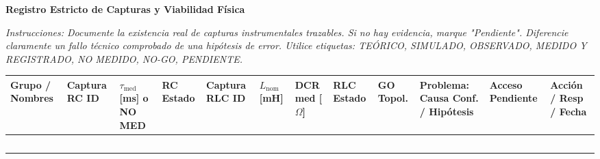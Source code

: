 \documentclass[11pt, a4paper, landscape]{article}
\begin{document}
\begin{tcolorbox}[colback=ucbblue!5!white, colframe=ucbblue, title=\textbf{Artefacto A1: Matriz de Evidencia y Diagnóstico Operativo (EC3)}]
    \centering \textbf{Registro Estricto de Capturas y Viabilidad Física}
\end{tcolorbox}

\noindent\textit{Instrucciones: Documente la existencia real de capturas instrumentales trazables. Si no hay evidencia, marque "Pendiente". Diferencie claramente un fallo técnico comprobado de una hipótesis de error. Utilice etiquetas: TEÓRICO, SIMULADO, OBSERVADO, MEDIDO Y REGISTRADO, NO MEDIDO, NO-GO, PENDIENTE.}

\vspace{0.3cm}
{\small
\setlength{\tabcolsep}{3pt}
\renewcommand{\arraystretch}{1.5}
\noindent
\begin{tabularx}{\textwidth}{
  >{\bfseries\RaggedRight\hsize=0.6\hsize}X 
  >{\RaggedRight\arraybackslash\hsize=0.8\hsize}X 
  >{\centering\arraybackslash\hsize=0.6\hsize}X 
  >{\centering\arraybackslash\hsize=0.7\hsize}X 
  >{\RaggedRight\arraybackslash\hsize=0.8\hsize}X 
  >{\centering\arraybackslash\hsize=0.6\hsize}X 
  >{\centering\arraybackslash\hsize=0.6\hsize}X 
  >{\centering\arraybackslash\hsize=0.7\hsize}X 
  >{\centering\arraybackslash\hsize=0.5\hsize}X 
  >{\RaggedRight\arraybackslash\hsize=1.2\hsize}X 
  >{\centering\arraybackslash\hsize=0.7\hsize}X 
  >{\RaggedRight\arraybackslash\hsize=1.2\hsize}X}
\toprule
\textbf{Grupo / Nombres} & \textbf{Captura RC ID} & \textbf{$\tau_{\text{med}}$ [ms] o NO MED} & \textbf{RC Estado} & \textbf{Captura RLC ID} & \textbf{$L_{\text{nom}}$ [mH]} & \textbf{DCR med [$\Omega$]} & \textbf{RLC Estado} & \textbf{GO Topol.} & \textbf{Problema: Causa Conf. / Hipótesis} & \textbf{Acceso Pendiente} & \textbf{Acción / Resp / Fecha} \\
\midrule
 & & & & & & & & & & & \\ \addlinespace
 & & & & & & & & & & & \\ \addlinespace
 & & & & & & & & & & & \\ \addlinespace
 & & & & & & & & & & & \\ \addlinespace
 & & & & & & & & & & & \\ 
\bottomrule
\end{tabularx}
}
\end{document}
